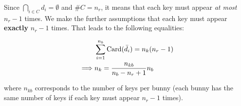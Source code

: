 \documentclass[12pt]{article}
\begin{document}
Since $\bigcap_{i \in C} d_i = \emptyset$ and $\# C = n_r$, it means that each key must appear \textit{at most} $n_r - 1$ times. We make the further assumptions that each key must appear \textbf{exactly} $n_r - 1$ times. That leads to the following equalities:

\begin{align}
    &\sum_{i=1}^{n_b} \mathrm{Card}(\bar{d_i}) = n_k (n_r - 1)\\
    \implies & n_k = \frac{n_{kb}}{n_b - n_r + 1} n_b
\end{align}

\noindent where $n_{kb}$ corresponds to the number of keys per bunny (each bunny has the same number of keys if each key must appear $n_r - 1$ times).
\end{document}
